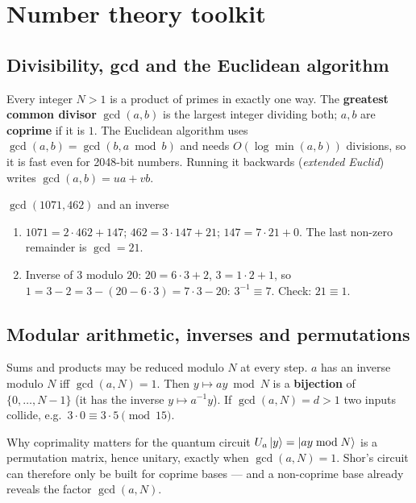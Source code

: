 \documentclass[11pt,a4paper,openany]{book}
\newcounter{wex}[chapter]
\newenvironment{steps}{\begin{enumerate}[label=\textbf{Step \arabic*.}, leftmargin=4.2em, itemsep=2pt]}{\end{enumerate}}
\begin{document}
\section{Number theory toolkit}
\subsection{Divisibility, gcd and the Euclidean algorithm}
Every integer $N > 1$ is a product of primes in exactly one way. The \textbf{greatest common divisor} $\gcd(a, b)$ is the largest integer dividing both;
$a, b$ are \textbf{coprime} if it is $1$. The Euclidean algorithm uses $\gcd(a, b) = \gcd(b, a \bmod b)$ and needs $O(\log\min(a, b))$ divisions, so it is
fast even for 2048-bit numbers. Running it backwards (\emph{extended Euclid}) writes $\gcd(a, b) = ua + vb$.

\begin{wexample}{$\gcd(1071, 462)$ and an inverse}
\begin{steps}
\item $1071 = 2\cdot462 + 147$; $462 = 3\cdot147 + 21$; $147 = 7\cdot21 + 0$. The last non-zero remainder is $\gcd = 21$.
\item Inverse of $3$ modulo $20$: $20 = 6\cdot3 + 2$, $3 = 1\cdot2 + 1$, so $1 = 3 - 2 = 3 - (20 - 6\cdot3) = 7\cdot3 - 20$: $3^{-1} \equiv 7$. Check: $21 \equiv 1$.
\end{steps}
\end{wexample}

\subsection{Modular arithmetic, inverses and permutations}
Sums and products may be reduced modulo $N$ at every step. $a$ has an inverse modulo $N$ iff $\gcd(a, N) = 1$. Then $y \mapsto ay \bmod N$ is a
\textbf{bijection} of $\{0, \dots, N - 1\}$ (it has the inverse $y \mapsto a^{-1}y$). If $\gcd(a, N) = d > 1$ two inputs collide, e.g.\ $3\cdot0 \equiv 3\cdot5 \pmod{15}$.

\begin{keyres}{Why coprimality matters for the quantum circuit}
$U_a\ket y = \ket{ay \bmod N}$ is a permutation matrix, hence unitary, exactly when $\gcd(a, N) = 1$. Shor's circuit can therefore only be built for
coprime bases --- and a non-coprime base already reveals the factor $\gcd(a, N)$.
\end{keyres}
\end{document}
